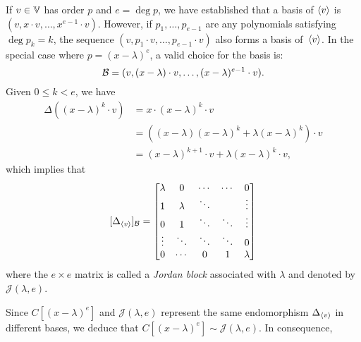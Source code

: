 \begin{rem}
    If\/ $v \in \mathbb V$ has order\/ $p$ and\/ $e = \deg p$, we have established that a basis of\/ $\langle v\rangle$ is\/ $(v, x \cdot v, \dots, x^{e-1} \cdot v)$. However, if\/ $p_1, \dots, p_{e-1}$ are any polynomials satisfying\/ $\deg p_k = k$, the sequence\/ $(v, p_1 \cdot v, \dots, p_{e-1} \cdot v)$ also forms a basis of\/~$\langle v\rangle$. In the special case where\/ $p = (x - \lambda)^e$, a valid choice for the basis is:
    $$
        \mathcal B=(v,(x-\lambda)\cdot v,\dots,(x-\lambda)^{e-1}\cdot v).
    $$
    Given $0\le k<e$, we have
    \begin{align*}
        \Delta((x-\lambda)^k\cdot v)
            &= x\cdot(x -\lambda)^k\cdot v\\
            &= ((x-\lambda)(x-\lambda)^k+\lambda(x-\lambda)^k)\cdot v\\
            &= (x-\lambda)^{k+1}\cdot v +\lambda(x-\lambda)^k\cdot v,
    \end{align*}
    which implies that
    \begin{equation}\label{eq:jordan-block}
        [\Delta_{\langle v\rangle}]_{\mathcal B} = \begin{bmatrix}
                \lambda & 0 & \cdots & \cdots & 0 \\
                1 & \lambda & \ddots &  & \vdots \\
                0 & 1 & \ddots & \ddots & \vdots \\
                \vdots & \ddots & \ddots & \ddots & 0 \\
                0 & \cdots & 0 & 1 & \lambda
            \end{bmatrix}
    \end{equation}
    where the $e\times e$ matrix is called a \textsl{Jordan block} associated with $\lambda$ and denoted by $\mathcal J(\lambda,e)$.
    
    Since $C[(x-\lambda)^e]$ and $\mathcal J(\lambda,e)$ represent the same endomorphism $\Delta_{\langle v\rangle}$ in different bases, we deduce that $C[(x-\lambda)^e]\sim\mathcal J(\lambda,e)$. In consequence,
\end{rem}

